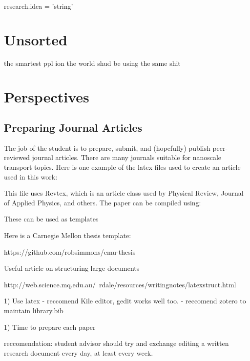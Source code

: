 \documentclass[letterpaper,12pt,amsmath,amssymb]{article}
\begin{document}
research.idea = 'string'

\section{Unsorted}
 
the smartest ppl ion the world shud be using the same shit

\section{Perspectives}

\subsection{Preparing Journal Articles}

The job of the student is to prepare, submit, and (hopefully) publish 
peer-reviewed journal articles. There are many journals suitable for 
nanoscale transport topics.  Here is one example of the latex files 
used to create an article used in this work:

This file uses Revtex, which is an article class used by Physical Review, 
Journal of Applied Physics, and others. The paper can be compiled using:



These can be used as templates



Here is a Carnegie Mellon thesis template:

https://github.com/robsimmons/cmu-thesis

Useful article on structuring large documents

http://web.science.mq.edu.au/~rdale/resources/writingnotes/latexstruct.html



1) Use latex
- reccomend Kile editor, gedit works well too. 
- reccomend zotero to maintain library.bib

1) Time to prepare each paper

reccomendation: student advisor should try and exchange editing a written 
research document every day, at least every week.  
\end{document}

